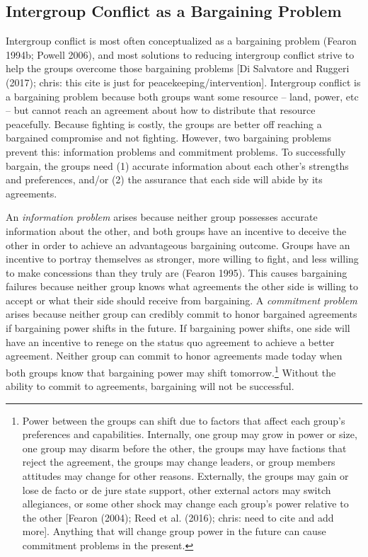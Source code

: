 \documentclass[11pt]{article}
\begin{document}
\subsection{Intergroup Conflict as a Bargaining
Problem}\label{intergroup-conflict-as-a-bargaining-problem}

Intergroup conflict is most often conceptualized as a bargaining problem
(Fearon 1994b; Powell 2006), and most solutions to reducing intergroup
conflict strive to help the groups overcome those bargaining problems
{[}Di Salvatore and Ruggeri (2017); chris: this cite is just for
peacekeeping/intervention{]}. Intergroup conflict is a bargaining
problem because both groups want some resource -- land, power, etc --
but cannot reach an agreement about how to distribute that resource
peacefully. Because fighting is costly, the groups are better off
reaching a bargained compromise and not fighting. However, two
bargaining problems prevent this: information problems and commitment
problems. To successfully bargain, the groups need (1) accurate
information about each other's strengths and preferences, and/or (2) the
assurance that each side will abide by its agreements.

An \emph{information problem} arises because neither group possesses
accurate information about the other, and both groups have an incentive
to deceive the other in order to achieve an advantageous bargaining
outcome. Groups have an incentive to portray themselves as stronger,
more willing to fight, and less willing to make concessions than they
truly are (Fearon 1995). This causes bargaining failures because neither
group knows what agreements the other side is willing to accept or what
their side should receive from bargaining. A \emph{commitment problem}
arises because neither group can credibly commit to honor bargained
agreements if bargaining power shifts in the future. If bargaining power
shifts, one side will have an incentive to renege on the status quo
agreement to achieve a better agreement. Neither group can commit to
honor agreements made today when both groups know that bargaining power
may shift tomorrow.\footnote{Power between the groups can shift due to
  factors that affect each group's preferences and capabilities.
  Internally, one group may grow in power or size, one group may disarm
  before the other, the groups may have factions that reject the
  agreement, the groups may change leaders, or group members attitudes
  may change for other reasons. Externally, the groups may gain or lose
  de facto or de jure state support, other external actors may switch
  allegiances, or some other shock may change each group's power
  relative to the other {[}Fearon (2004); Reed et al. (2016); chris:
  need to cite and add more{]}. Anything that will change group power in
  the future can cause commitment problems in the present.} Without the
ability to commit to agreements, bargaining will not be successful.
\end{document}
